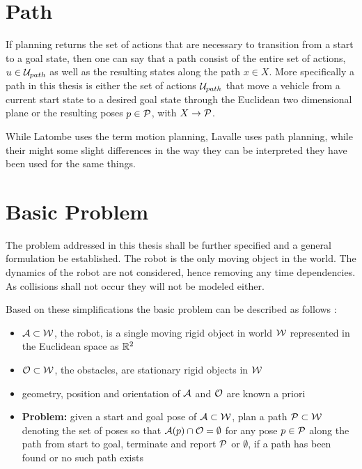 \section{Path}
If planning returns the set of actions that are necessary to transition from a start to a goal state, then one can say that a path consist of the entire set of actions, $u \in \mathcal{U}_{path}$ as well as the resulting states along the path $x \in X$. More specifically a path in this thesis is either the set of actions $\mathcal{U}_{path}$ that move a vehicle from a current start state to a desired goal state through the Euclidean two dimensional plane or the resulting poses $p \in \mathcal{P}$, with $X \rightarrow \mathcal{P}$.

While Latombe uses the term motion planning, Lavalle uses path planning, while their might some slight differences in the way they can be interpreted they have been used for the same things. %

\section{Basic Problem}
The problem addressed in this thesis shall be further specified and a general formulation be established. The robot is the only moving object in the world. The dynamics of the robot are not considered, hence removing any time dependencies. As collisions shall not occur they will not be modeled either.

Based on these simplifications the basic problem can be described as follows \cite{Latombe.1991,LaValle.2006}:
\begin{itemize}
\item $\mathcal{A} \subset \mathcal{W}$, the robot, is a single moving rigid object in world $\mathcal{W}$ represented in the Euclidean space as $\mathbb{R}^2$
\item $\mathcal{O} \subset \mathcal{W}$, the obstacles, are stationary rigid objects in $\mathcal{W}$
\item geometry, position and orientation of $\mathcal{A}$ and $\mathcal{O}$ are known a priori
\item \textbf{Problem:} given a start and goal pose of $\mathcal{A} \subset \mathcal{W}$, plan a path $\mathcal{P} \subset \mathcal{W}$ denoting the set of poses so that $\mathcal{A}(p) \cap \mathcal{O} = \emptyset$ for any pose  $p \in \mathcal{P}$ along the path from start to goal, terminate and report $\mathcal{P}$ or $\emptyset$, if a path has been found or no such path exists
\end{itemize}

